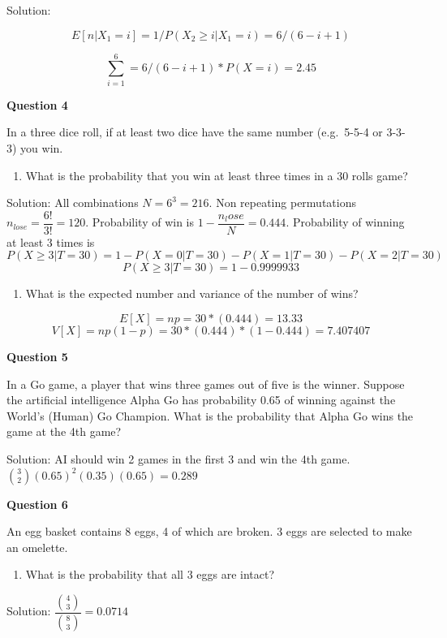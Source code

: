 \documentclass[]{book}
\providecommand{\tightlist}{%
  \setlength{\itemsep}{0pt}\setlength{\parskip}{0pt}}
\theoremstyle{definition}
\theoremstyle{definition}
\theoremstyle{definition}
\theoremstyle{remark}
\begin{document}
Solution:

\[E[n|X_1=i] = 1/P(X_2 \ge i| X_1 = i) = 6/(6-i+1)\]

\[\sum_{i=1}^6 = 6/(6-i+1) * P(X=i) = 2.45\]

\textbf{Question 4}

In a three dice roll, if at least two dice have the same number
(e.g.~5-5-4 or 3-3-3) you win.

\begin{enumerate}
\def\labelenumi{\alph{enumi})}
\tightlist
\item
  What is the probability that you win at least three times in a 30
  rolls game?
\end{enumerate}

Solution: All combinations \(N = 6^3 = 216\). Non repeating permutations
\(n_{lose} = \dfrac{6!}{3!} = 120\). Probability of win is
\(1 - \dfrac{n_lose}{N} = 0.444\). Probability of winning at least 3
times is
\[P(X \ge 3| T = 30) = 1 - P(X = 0|T=30) - P(X = 1|T=30) - P(X=2|T=30)\]
\[P(X \ge 3| T = 30) = 1 - 0.9999933\]

\begin{enumerate}
\def\labelenumi{\alph{enumi})}
\setcounter{enumi}{1}
\tightlist
\item
  What is the expected number and variance of the number of wins?
\end{enumerate}

\[E[X] = np = 30*(0.444) = 13.33\]
\[V[X] = np(1-p) = 30*(0.444)*(1-0.444) = 7.407407\]

\textbf{Question 5}

In a Go game, a player that wins three games out of five is the winner.
Suppose the artificial intelligence Alpha Go has probability 0.65 of
winning against the World's (Human) Go Champion. What is the probability
that Alpha Go wins the game at the 4th game?

Solution: AI should win 2 games in the first 3 and win the 4th game.
\(\binom{3}{2}(0.65)^2(0.35)(0.65) = 0.289\)

\textbf{Question 6}

An egg basket contains 8 eggs, 4 of which are broken. 3 eggs are
selected to make an omelette.

\begin{enumerate}
\def\labelenumi{\alph{enumi})}
\tightlist
\item
  What is the probability that all 3 eggs are intact?
\end{enumerate}

Solution: \(\dfrac{\binom{4}{3}}{\binom{8}{3}} = 0.0714\)
\end{document}
